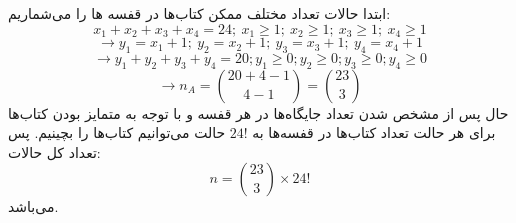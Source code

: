 \p
ابتدا حالات تعداد مختلف ممکن کتاب‌ها در قفسه ها را می‌شماریم:
$$x_1+x_2+x_3+x_4=24;\: x_1\geq 1;\: x_2\geq 1;\: x_3\geq 1;\: x_4\geq 1$$
$$\rightarrow y_1=x_1+1;\: y_2=x_2+1;\: y_3=x_3+1;\: y_4=x_4+1$$
$$\rightarrow y_1+y_2+y_3+y_4=20; y_1\geq 0; y_2\geq 0; y_3\geq 0; y_4\geq 0$$
$$\rightarrow n_A = {20+4-1 \choose 4-1} = {23 \choose 3}$$
حال پس از مشخص شدن تعداد جایگاه‌ها در هر قفسه و با توجه به متمایز بودن کتاب‌ها برای هر حالت تعداد کتاب‌ها در قفسه‌ها به 
$24!$
حالت می‌توانیم کتاب‌ها را بچینیم.
پس تعداد کل حالات:
$$n = {23 \choose 3} \times 24!$$
می‌باشد.